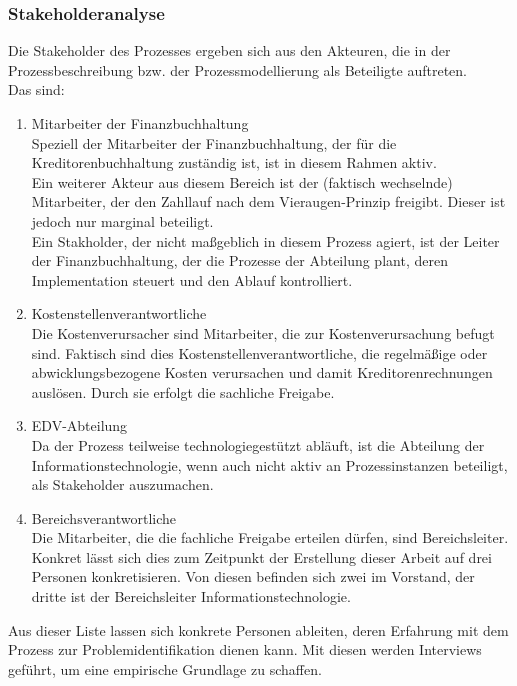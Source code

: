 \subsubsection{Stakeholderanalyse}
Die Stakeholder des Prozesses ergeben sich aus den Akteuren, die in der Prozessbeschreibung bzw. der Prozessmodellierung als Beteiligte auftreten.\\
Das sind:


\begin{enumerate}
\item{Mitarbeiter der Finanzbuchhaltung}
\\ Speziell der Mitarbeiter der Finanzbuchhaltung, der für die Kreditorenbuchhaltung zuständig ist, ist in diesem Rahmen aktiv. 
\\ Ein weiterer Akteur aus diesem Bereich ist der (faktisch wechselnde) Mitarbeiter, der den Zahllauf nach dem Vieraugen-Prinzip freigibt. 
Dieser ist jedoch nur marginal beteiligt.
\\ Ein Stakholder, der nicht maßgeblich in diesem Prozess agiert, ist der Leiter der Finanzbuchhaltung, der die Prozesse der Abteilung plant, deren Implementation steuert und den Ablauf kontrolliert.

\item{Kostenstellenverantwortliche}
\\ Die Kostenverursacher sind Mitarbeiter, die zur Kostenverursachung befugt sind. 
Faktisch sind dies Kostenstellenverantwortliche, die regelmäßige oder abwicklungsbezogene Kosten verursachen und damit Kreditorenrechnungen auslösen. 
Durch sie erfolgt die sachliche Freigabe.

\item{EDV-Abteilung}
\\ Da der Prozess teilweise technologiegestützt abläuft, ist die Abteilung der Informationstechnologie, wenn auch nicht aktiv an Prozessinstanzen beteiligt, als Stakeholder auszumachen. 

\item{Bereichsverantwortliche}
\\ Die Mitarbeiter, die die fachliche Freigabe erteilen dürfen, sind Bereichsleiter. 
Konkret lässt sich dies zum Zeitpunkt der Erstellung dieser Arbeit auf drei Personen konkretisieren. 
Von diesen befinden sich zwei im Vorstand, der dritte ist der Bereichsleiter Informationstechnologie.

\end{enumerate}

Aus dieser Liste lassen sich konkrete Personen ableiten, deren Erfahrung mit dem Prozess zur Problemidentifikation dienen kann. 
Mit diesen werden Interviews geführt, um eine empirische Grundlage zu schaffen.

